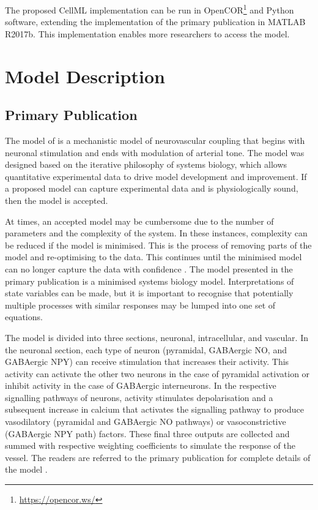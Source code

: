 \documentclass[fleqn,10pt]{physiome}
\begin{document}
The proposed CellML implementation can be run in OpenCOR\footnote{\url{https://opencor.ws/}} and Python software, extending the implementation of the primary publication in MATLAB R2017b. This implementation enables more researchers to access the model.


\section{Model Description}
\subsection{Primary Publication}

The model of \cite{Sten2020} is a mechanistic model of neurovascular coupling that begins with neuronal stimulation and ends with modulation of arterial tone. The model was designed based on the iterative philosophy of systems biology, which allows quantitative experimental data to drive model development and improvement. If a proposed model can capture experimental data and is physiologically sound, then the model is accepted.

At times, an accepted model may be cumbersome due to the number of parameters and the complexity of the system. In these instances, complexity can be reduced if the model is minimised. This is the process of removing parts of the model and re-optimising to the data. This continues until the minimised model can no longer capture the data with confidence \citep{lundengard2016}. The model presented in the primary publication is a minimised systems biology model. Interpretations of state variables can be made, but it is important to recognise that potentially multiple processes with similar responses may be lumped into one set of equations.

The model is divided into three sections, neuronal, intracellular, and vascular. In the neuronal section, each type of neuron (pyramidal, GABAergic NO, and GABAergic NPY) can receive stimulation that increases their activity. This activity can activate the other two neurons in the case of pyramidal activation or inhibit activity in the case of GABAergic interneurons. In the respective signalling pathways of neurons, activity stimulates depolarisation and a subsequent increase in calcium that activates the signalling pathway to produce vasodilatory (pyramidal and GABAergic NO pathways) or vasoconstrictive (GABAergic NPY path) factors. These final three outputs are collected and summed with respective weighting coefficients to simulate the response of the vessel. The readers are referred to the primary publication for complete details of the model \citep{Sten2020}.
\end{document}
